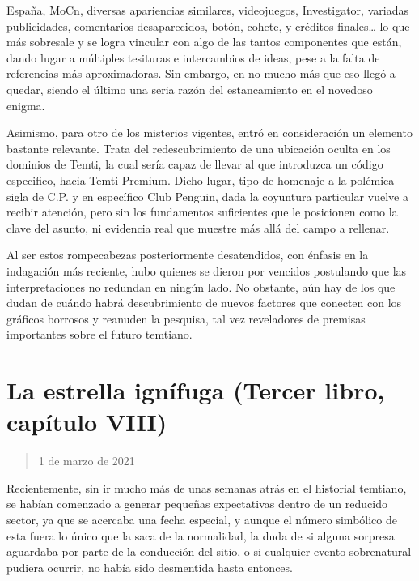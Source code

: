 \documentclass[
]{book}
\begin{document}
España, MoCn, diversas apariencias similares, videojuegos, Investigator, variadas publicidades, comentarios desaparecidos, botón, cohete, y créditos finales\ldots{} lo que más sobresale y se logra vincular con algo de las tantos componentes que están, dando lugar a múltiples tesituras e intercambios de ideas, pese a la falta de referencias más aproximadoras. Sin embargo, en no mucho más que eso llegó a quedar, siendo el último una seria razón del estancamiento en el novedoso enigma.

Asimismo, para otro de los misterios vigentes, entró en consideración un elemento bastante relevante. Trata del redescubrimiento de una ubicación oculta en los dominios de Temti, la cual sería capaz de llevar al que introduzca un código especifico, hacia Temti Premium. Dicho lugar, tipo de homenaje a la polémica sigla de C.P. y en específico Club Penguin, dada la coyuntura particular vuelve a recibir atención, pero sin los fundamentos suficientes que le posicionen como la clave del asunto, ni evidencia real que muestre más allá del campo a rellenar.

Al ser estos rompecabezas posteriormente desatendidos, con énfasis en la indagación más reciente, hubo quienes se dieron por vencidos postulando que las interpretaciones no redundan en ningún lado. No obstante, aún hay de los que dudan de cuándo habrá descubrimiento de nuevos factores que conecten con los gráficos borrosos y reanuden la pesquisa, tal vez reveladores de premisas importantes sobre el futuro temtiano.

\hypertarget{la-estrella-ignuxedfuga-tercer-libro-capuxedtulo-viii}{%
\section{La estrella ignífuga (Tercer libro, capítulo VIII)}\label{la-estrella-ignuxedfuga-tercer-libro-capuxedtulo-viii}}

\begin{quote}
1 de marzo de 2021
\end{quote}

Recientemente, sin ir mucho más de unas semanas atrás en el historial temtiano, se habían comenzado a generar pequeñas expectativas dentro de un reducido sector, ya que se acercaba una fecha especial, y aunque el número simbólico de esta fuera lo único que la saca de la normalidad, la duda de si alguna sorpresa aguardaba por parte de la conducción del sitio, o si cualquier evento sobrenatural pudiera ocurrir, no había sido desmentida hasta entonces.
\end{document}
